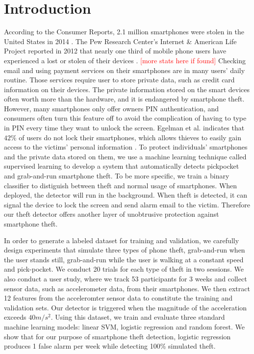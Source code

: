 \documentclass{soups}
\begin{document}
\section{Introduction}
According to the Consumer Reports, 2.1 million smartphones were stolen in the United States in 2014 \cite{deitrick:consumer}. The Pew Research Center's Internet \& American Life Project reported in 2012 that nearly one third of mobile phone users have experienced a lost or stolen of their devices \cite{boyles:pew}. \textcolor{red}{[more stats here if found]} Checking email and using payment services on their smartphones are in many users' daily routine. Those services require user to store private data, such as credit card information on their devices. The private information stored on the smart devices often worth more than the hardware, and it is endangered by smartphone theft. However, many smartphones only offer owners PIN authentication, and consumers often turn this feature off to avoid the complication of having to type in PIN every time they want to unlock the screen. Egelman et al. indicates that $42\%$ of users do not lock their smartphones, which allows thieves to easily gain access to the victims' personal information \cite{egelman:lock}. To protect individuals' smartphones and the private data stored on them, we use a machine learning technique called supervised learning to develop a system that automatically detects pickpocket and grab-and-run smartphone theft. To be more specific, we train a binary classifier to distiguish between theft and normal usage of smartphones. When deployed, the detector will run in the background. When theft is detected, it can signal the device to lock the screen and send alarm email to the victim. Therefore our theft detector offers another layer of unobtrusive protection against smartphone theft.

In order to generate a labeled dataset for training and validation, we carefully design experiments that simulate three types of phone theft, grab-and-run when the user stands still, grab-and-run while the user is walking at a constant speed and pick-pocket. We conduct 20 trials for each type of theft in two sessions. We also conduct a user study, where we track 53 participants for 3 weeks and collect sensor data, such as accelerometer data, from their smartphones. We then extract 12 features from the acceleromter sensor data to constitute the training and validation sets. Our detector is triggered when the magnitude of the acceleration exceeds $40m/s^2$. Using this dataset, we train and evaluate three standard machine learning models: linear SVM, logistic regression and random forest. We show that for our purpose of smartphone theft detection, logistic regression produces 1 false alarm per week while detecting 100\% simulated theft.
\end{document}
